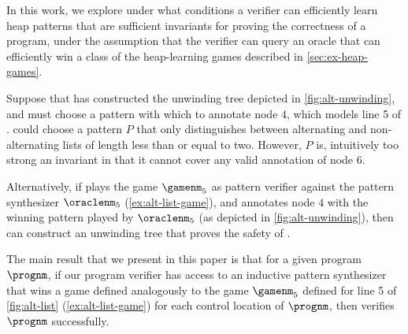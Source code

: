 In this work, we explore under what conditions a verifier can
efficiently learn heap patterns that are sufficient invariants for
proving the correctness of a program, under the assumption that the
verifier can query an oracle that can efficiently win a class of the
heap-learning games described in \autoref{sec:ex-heap-games}.
%
\begin{ex}
  \label{ex:alt-list-pat-syn}
  Suppose that \verifier has constructed the unwinding tree depicted
  in \autoref{fig:alt-unwinding}, and must choose a pattern with which
  to annotate node $4$, which models line 5 of \altlist.
  \verifier could choose a pattern $P$ that only distinguishes between
  alternating and non-alternating lists of length less than or equal
  to two.
  However, $P$ is, intuitively too strong an invariant in that it
  cannot cover any valid annotation of node $6$.

  Alternatively, if \verifier plays the game $\gamenm_5$ as pattern
  verifier against the pattern synthesizer $\oraclenm_5$
  (\autoref{ex:alt-list-game}), and annotates node $4$ with the
  winning pattern played by $\oraclenm_5$ (as depicted in
  \autoref{fig:alt-unwinding}), then \verifier can construct an
  unwinding tree that proves the safety of \altlist.
\end{ex}

The main result that we present in this paper is that for a given
program $\prognm$, if our program verifier \verifier has access to an
inductive pattern synthesizer that wins a game defined analogously to
the game $\gamenm_5$ defined for line 5 of \autoref{fig:alt-list}
(\autoref{ex:alt-list-game}) for each control location of $\prognm$,
then \verifier verifies $\prognm$ successfully.

